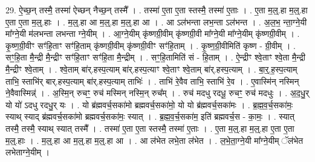 \documentclass[17pt]{extarticle}
\begin{document}
29. ऐ॒च्छ॒न् तस्मै॒ तस्मा॑ ऐच्छन् नैच्छ॒न् तस्मै᳚ । . तस्मा॑ ए॒ता ए॒ता स्तस्मै॒ तस्मा॑ ए॒ताः । . ए॒ता म॒ल्॒.हा म॒ल्॒.हा ए॒ता ए॒ता म॒ल्॒.हाः । . म॒ल्॒.हा आ म॒ल्॒.हा म॒ल्॒.हा आ । . आ ऽल॑भन्ता लभ॒न्ता ऽल॑भन्त । . अ॒ल॒भ॒ न्ता॒ग्ने॒यी मा᳚ग्ने॒यी म॑लभन्ता लभन्ता ग्ने॒यीम् । . आ॒ग्ने॒यीम् कृ॑ष्णग्री॒वीम् कृ॑ष्णग्री॒वी मा᳚ग्ने॒यी मा᳚ग्ने॒यीम् कृ॑ष्णग्री॒वीम् । . कृ॒ष्ण॒ग्री॒वीꣳ सꣳ॑हि॒ताꣳ सꣳ॑हि॒ताम् कृ॑ष्णग्री॒वीम् कृ॑ष्णग्री॒वीꣳ सꣳ॑हि॒ताम् । . कृ॒ष्ण॒ग्री॒वीमिति॑ कृष्ण - ग्री॒वीम् । . सꣳ॒॒हि॒ता मै॒न्द्री मै॒न्द्रीꣳ सꣳ॑हि॒ताꣳ सꣳ॑हि॒ता मै॒न्द्रीम् । . सꣳ॒॒हि॒तामिति॑ सं - हि॒ताम् । . ऐ॒न्द्रीꣳ श्वे॒ताꣳ श्वे॒ता मै॒न्द्री मै॒न्द्रीꣳ श्वे॒ताम् । . श्वे॒ताम् बा॑र्.हस्प॒त्याम् बा॑र्.हस्प॒त्याꣳ श्वे॒ताꣳ श्वे॒ताम् बा॑र्.हस्प॒त्याम् । . बा॒र्॒.ह॒स्प॒त्याम् ताभि॒ स्ताभि॑र् बार्.हस्प॒त्याम् बा॑र्.हस्प॒त्याम् ताभिः॑ । . ताभि॑ रे॒वैव ताभि॒ स्ताभि॑ रे॒व । . ए॒वास्मि॑न् नस्मिन् ने॒वैवास्मिन्न्॑ । . अ॒स्मि॒न् रुचꣳ॒॒ रुच॑ मस्मिन् नस्मि॒न् रुच᳚म् । . रुच॑ मदधु रदधू॒ रुचꣳ॒॒ रुच॑ मदधुः । . अ॒द॒धु॒र् यो यो॑ ऽदधु रदधु॒र् यः । . यो ब्र॑ह्मवर्च॒सका॑मो ब्रह्मवर्च॒सका॑मो॒ यो यो ब्र॑ह्मवर्च॒सका॑मः । . ब्र॒ह्म॒व॒र्च॒सका॑मः॒ स्याथ् स्याद् ब्र॑ह्मवर्च॒सका॑मो ब्रह्मवर्च॒सका॑मः॒ स्यात् । . ब्र॒ह्म॒व॒र्च॒सका॑म॒ इति॑ ब्रह्मवर्च॒स - का॒मः॒ । . स्यात् तस्मै॒ तस्मै॒ स्याथ् स्यात् तस्मै᳚ । . तस्मा॑ ए॒ता ए॒ता स्तस्मै॒ तस्मा॑ ए॒ताः । . ए॒ता म॒ल्॒.हा म॒ल्॒.हा ए॒ता ए॒ता म॒ल्॒.हाः । . म॒ल्॒.हा आ म॒ल्॒.हा म॒ल्॒.हा आ । . आ ल॑भेत लभे॒ता ल॑भेत । . ल॒भे॒ता॒ग्ने॒यी मा᳚ग्ने॒यीम् ॅल॑भेत लभेताग्ने॒यीम् । \newline
\end{document}
